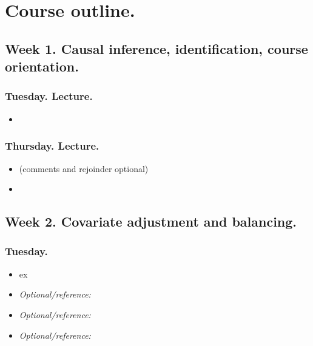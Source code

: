 \documentclass[letterpaper, 12pt, parskip=full,DIV=10]{scrartcl}
\begin{document}
\section*{Course outline.}

\subsection*{Week 1. Causal inference, identification, course orientation.}


\subsubsection*{Tuesday. Lecture.}
\begin{itemize}
\item {}
\end{itemize}

\subsubsection*{Thursday. Lecture.}

\begin{itemize}
\item {}

(comments and rejoinder optional)
\item {}
\end{itemize}

\subsection*{Week 2. Covariate adjustment and balancing.}



\subsubsection*{Tuesday.}

\begin{itemize}
\item {} ex
\item \textit{Optional/reference:} 
\item \textit{Optional/reference:} 
\item \textit{Optional/reference:} 
\end{itemize}
\end{document}
